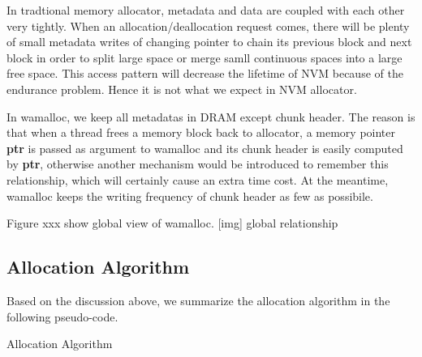 \documentclass{vldb}
\begin{document}
In tradtional memory allocator, metadata and data are coupled with each other very tightly.
When an allocation/deallocation request comes, there will be plenty of small metadata writes of changing pointer to chain its previous block and next block in order to split large space or merge samll continuous spaces into a large free space.
This access pattern will decrease the lifetime of NVM because of the endurance problem.
Hence it is not what we expect in NVM allocator.

In wamalloc, we keep all metadatas in DRAM except chunk header. 
The reason is that when a thread frees a memory block back to allocator, a memory pointer \textbf{ptr} is passed as argument to wamalloc and its chunk header is easily computed by \textbf{ptr},
otherwise another mechanism would be introduced to remember this relationship, which will certainly cause an extra time cost.
At the meantime, wamalloc keeps the writing frequency of chunk header as few as possibile.

Figure xxx show global view of wamalloc.
[img] global relationship

\subsection{Allocation Algorithm}

Based on the discussion above, we summarize the allocation algorithm in the following pseudo-code.

\begin{algorithm}
\caption{Allocation Algorithm}\label{euclid}
\end{algorithm}
\end{document}
